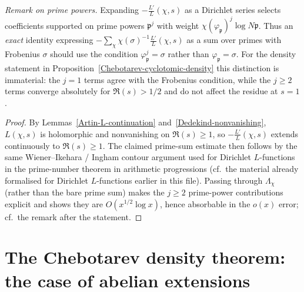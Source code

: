 \emph{Remark on prime powers.}
Expanding $-\frac{L'}{L}(\chi,s)$ as a Dirichlet series selects coefficients supported on
prime powers $\mathfrak{p}^j$ with weight $\chi(\varphi_{\mathfrak{p}})^j\log N\mathfrak{p}$.
Thus an \emph{exact} identity expressing $-\sum_\chi \chi(\sigma)^{-1}\frac{L'}{L}(\chi,s)$ as a
sum over primes with Frobenius $\sigma$ should use the condition $\varphi_{\mathfrak{p}}^j=\sigma$
rather than $\varphi_{\mathfrak{p}}=\sigma$.  For the density statement in
Proposition~\ref{Chebotarev-cyclotomic-density} this distinction is immaterial: the $j=1$ terms
agree with the Frobenius condition, while the $j\geq 2$ terms converge absolutely for
$\Re(s)>1/2$ and do not affect the residue at $s=1$.
\begin{proof}
By Lemmas~\ref{Artin-L-continuation} and~\ref{Dedekind-nonvanishing}, $L(\chi,s)$ is holomorphic
and nonvanishing on $\Re(s)\geq 1$, so $-\frac{L'}{L}(\chi,s)$ extends continuously to
$\Re(s)\geq 1$.  The claimed prime-sum estimate then follows by the same Wiener--Ikehara /
Ingham contour argument used for Dirichlet $L$-functions in the prime-number theorem in
arithmetic progressions (cf.\ the material already formalised for Dirichlet $L$-functions
earlier in this file).  Passing through $\Lambda_\chi$ (rather than the bare prime sum) makes
the $j\geq 2$ prime-power contributions explicit and shows they are $O(x^{1/2}\log x)$,
hence absorbable in the $o(x)$ error; cf.\ the remark after the statement.
\end{proof}
\section{The Chebotarev density theorem: the case of abelian extensions}

